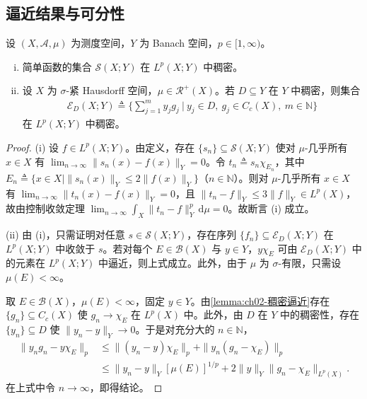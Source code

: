\documentclass[../../main.tex]{subfiles}%
\begin{document}
\subsection{逼近结果与可分性}\label{subsection:ch04-逼近可分}

\begin{proposition}\label{proposition:ch04-简单函数稠密}\label{proposition:ch04-稠密}
设 $(X,\mathcal{A},\mu)$ 为测度空间，$Y$ 为 Banach 空间，$p\in[1,\infty)$。
\begin{enumerate}[(i)]
\item\label{item:ch04-简单函数稠密-i} 简单函数的集合 $\mathcal{S}(X;Y)$ 在 $L^p(X;Y)$ 中稠密。
\item\label{item:ch04-简单函数稠密-ii} 设 $X$ 为 $\sigma$-紧 Hausdorff 空间，$\mu\in\mathscr{R}^+(X)$。若 $D\subseteq Y$ 在 $Y$ 中稠密，则集合
\begin{align}
\mathcal{E}_D(X;Y)\triangleq \Big\{\sum_{j=1}^m y_jg_j\ \Big|\ y_j\in D,\ g_j\in C_c(X),\ m\in\mathbb{N}\Big\} \label{align:ch04-4.71}
\end{align}
在 $L^p(X;Y)$ 中稠密。
\end{enumerate}
\end{proposition}

\begin{proof}
(i) 设 $f\in L^p(X;Y)$。由定义，存在 $\{s_n\}\subseteq\mathcal{S}(X;Y)$ 使对 $\mu$-几乎所有 $x\in X$ 有 $\lim_{n\to\infty}\|s_n(x)-f(x)\|_Y=0$。令 $t_n\triangleq s_n\chi_{E_n}$，其中 $E_n\triangleq \{x\in X\mid\|s_n(x)\|_Y\leqslant2\|f(x)\|_Y\}$（$n\in\mathbb{N}$）。则对 $\mu$-几乎所有 $x\in X$ 有 $\lim_{n\to\infty}\|t_n(x)-f(x)\|_Y=0$，且 $\|t_n-f\|_Y\leqslant3\|f\|_Y\in L^p(X)$，故由控制收敛定理 $\lim_{n\to\infty}\int_X\|t_n-f\|_Y^p\,\mathrm{d}\mu=0$。故断言 (i) 成立。

(ii) 由 (i)，只需证明对任意 $s\in\mathcal{S}(X;Y)$，存在序列 $\{f_n\}\subseteq\mathcal{E}_D(X;Y)$ 在 $L^p(X;Y)$ 中收敛于 $s$。若对每个 $E\in\mathcal{B}(X)$ 与 $y\in Y$，$y\chi_E$ 可由 $\mathcal{E}_D(X;Y)$ 中的元素在 $L^p(X;Y)$ 中逼近，则上式成立。此外，由于 $\mu$ 为 $\sigma$-有限，只需设 $\mu(E)<\infty$。

取 $E\in\mathcal{B}(X)$，$\mu(E)<\infty$，固定 $y\in Y$。由\cref{lemma:ch02-稠密逼近}存在 $\{g_n\}\subseteq C_c(X)$ 使 $g_n\to\chi_E$ 在 $L^p(X)$ 中。此外，由 $D$ 在 $Y$ 中的稠密性，存在 $\{y_n\}\subseteq D$ 使 $\|y_n-y\|_Y\to0$。于是对充分大的 $n\in\mathbb{N}$，
\begin{align*}
\|y_ng_n-y\chi_E\|_p&\leqslant\|(y_n-y)\chi_E\|_p+\|y_n(g_n-\chi_E)\|_p\\
&\leqslant\|y_n-y\|_Y[\mu(E)]^{1/p}+2\|y\|_Y\|g_n-\chi_E\|_{L^p(X)}.
\end{align*}
在上式中令 $n\to\infty$，即得结论。
\end{proof}
\end{document}
